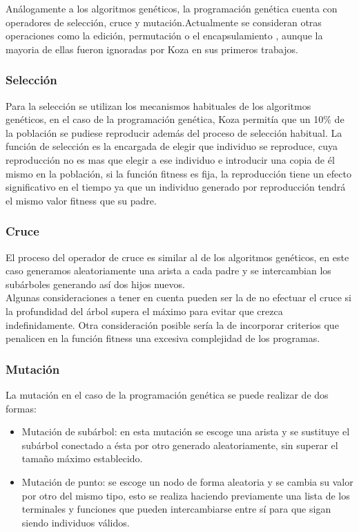 \documentclass[12pt]{article} \usepackage[utf8x]{inputenc}
\begin{document}
Análogamente a los algoritmos genéticos, la programación genética
cuenta con operadores de selección, cruce y mutación.Actualmente se
consideran otras operaciones como la edición, permutación o el
encapsulamiento , aunque la mayoria de ellas fueron ignoradas por Koza
en sus primeros trabajos.

\subsubsection{Selección}

Para la selección se utilizan los mecanismos habituales de los
algoritmos genéticos, en el caso de la programación genética, Koza
permitía que un 10\% de la población se pudiese reproducir además del
proceso de selección habitual. La función de selección es la encargada
de elegir que individuo se reproduce, cuya reproducción no es mas que
elegir a ese individuo e introducir una copia de él mismo en la
población, si la función fitness es fija, la reproducción tiene un
efecto significativo en el tiempo ya que un individuo generado por
reproducción tendrá el mismo valor fitness que su padre.

\subsubsection{Cruce}

El proceso del operador de cruce es similar al de los algoritmos genéticos,
en este caso generamos aleatoriamente una arista a cada padre y se
intercambian los subárboles generando así dos hijos nuevos.\\

Algunas consideraciones a tener en cuenta pueden ser la de no efectuar
el cruce si la profundidad del árbol supera el máximo para evitar que
crezca indefinidamente. Otra consideración posible sería la de
incorporar criterios que penalicen en la función fitness una excesiva
complejidad de los programas.

\subsubsection{Mutación}

La mutación en el caso de la programación genética se puede realizar
de dos formas:

\begin{itemize}
\item Mutación de subárbol: en esta mutación se escoge una arista y se
  sustituye el subárbol conectado a ésta por otro generado
  aleatoriamente, sin superar el tamaño máximo establecido.
\item Mutación de punto: se escoge un nodo de forma aleatoria y se
  cambia su valor por otro del mismo tipo, esto se realiza haciendo
  previamente una lista de los terminales y funciones que pueden
  intercambiarse entre sí para que sigan siendo individuos válidos.
\end{itemize}
\end{document}
